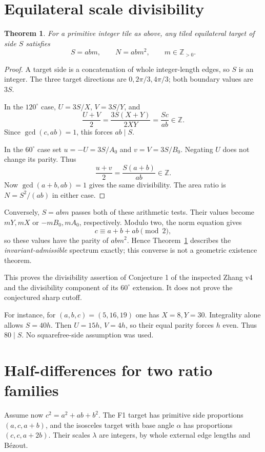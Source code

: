 \documentclass[11pt]{article}
\newtheorem{theorem}{Theorem}
\newcommand{\Z}{\mathbb Z}
\begin{document}
\section{Equilateral scale divisibility}
\begin{theorem}\label{thm:equilateral}
For a primitive integer tile as above, any tiled equilateral target of side $S$ satisfies
\[
\boxed{S=abm,\qquad N=abm^2,\qquad m\in\Z_{>0}.}
\]
\end{theorem}
\begin{proof}
A target side is a concatenation of whole integer-length edges, so $S$ is an integer. The three target directions are $0,2\pi/3,4\pi/3$; both boundary values are $3S$.

In the $120^\circ$ case, $U=3S/X$, $V=3S/Y$, and
\[
\frac{U+V}{2}=\frac{3S(X+Y)}{2XY}=\frac{Sc}{ab}\in\Z.
\]
Since $\gcd(c,ab)=1$, this forces $ab\mid S$.

In the $60^\circ$ case set $u=-U=3S/A_0$ and $v=V=3S/B_0$. Negating $U$ does not change its parity. Thus
\[
\frac{u+v}{2}=\frac{S(a+b)}{ab}\in\Z.
\]
Now $\gcd(a+b,ab)=1$ gives the same divisibility. The area ratio is $N=S^2/(ab)$ in either case.
\end{proof}

Conversely, $S=abm$ passes both of these arithmetic tests. Their values become $mY,mX$ or $-mB_0,mA_0$, respectively. Modulo two, the norm equation gives
\[
c\equiv a+b+ab\pmod2,
\]
so these values have the parity of $abm^2$. Hence Theorem~\ref{thm:equilateral} describes the \emph{invariant-admissible} spectrum exactly; this converse is not a geometric existence theorem.

This proves the divisibility assertion of Conjecture 1 of the inspected Zhang v4 and the divisibility component of its $60^\circ$ extension. It does not prove the conjectured sharp cutoff.

For instance, for $(a,b,c)=(5,16,19)$ one has $X=8,Y=30$. Integrality alone allows $S=40h$. Then $U=15h$, $V=4h$, so their equal parity forces $h$ even. Thus $80\mid S$. No squarefree-side assumption was used.

\section{Half-differences for two ratio families}\label{sec:ratios}
Assume now $c^2=a^2+ab+b^2$. The F1 target has primitive side proportions $(a,c,a+b)$, and the isosceles target with base angle $\alpha$ has proportions $(c,c,a+2b)$. Their scales $\lambda$ are integers, by whole external edge lengths and B\'ezout.
\end{document}
